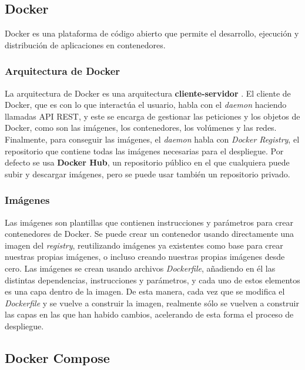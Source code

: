 \subsection{Docker}

Docker es una plataforma de código abierto que permite el desarrollo, ejecución y distribución de aplicaciones en contenedores.

\subsubsection{Arquitectura de Docker}


La arquitectura de Docker es una arquitectura \textbf{cliente-servidor} \cite{docker:overview-architecture}. El cliente de Docker, que es con lo que interactúa el usuario, habla con el \textit{daemon} haciendo llamadas API REST, y este se encarga de gestionar las peticiones y los objetos de Docker, como son las imágenes, los contenedores, los volúmenes y las redes. Finalmente, para conseguir las imágenes, el \textit{daemon} habla con \textit{Docker Registry}, el repositorio que contiene todas las imágenes necesarias para el despliegue. Por defecto se usa \textbf{Docker Hub}, un repositorio público en el que cualquiera puede subir y descargar imágenes, pero se puede usar también un repositorio privado.

\subsubsection{Imágenes}

Las imágenes son plantillas que contienen instrucciones y parámetros para crear contenedores de Docker. Se puede crear un contenedor usando directamente una imagen del \textit{registry}, reutilizando imágenes ya existentes como base para crear nuestras propias imágenes, o incluso creando nuestras propias imágenes desde cero. Las imágenes se crean usando archivos \textit{Dockerfile}, añadiendo en él las distintas dependencias, instrucciones y parámetros, y cada uno de estos elementos es una capa dentro de la imagen. De esta manera, cada vez que se modifica el \textit{Dockerfile} y se vuelve a construir la imagen, realmente sólo se vuelven a construir las capas en las que han habido cambios, acelerando de esta forma el proceso de despliegue.
\cite{docker:overview-objects}

\subsection{Docker Compose}

